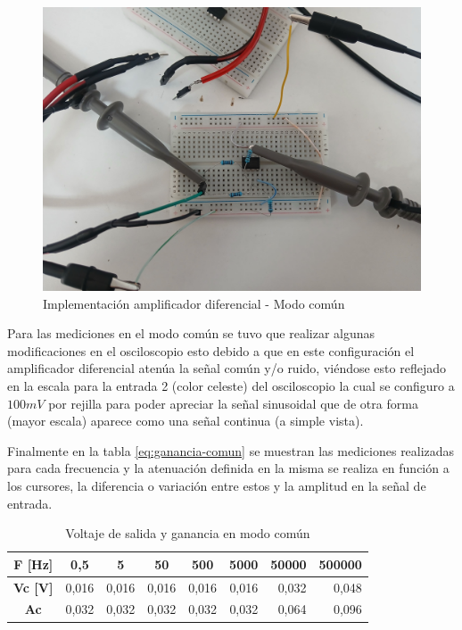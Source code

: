 \begin{figure}[h]
	\centering
	\includegraphics[width=0.5\linewidth]{media/imp-circuito-mod-comun}
	\caption{Implementación amplificador diferencial - Modo común}
	\label{fig:imp-circuito-mod-comun}
\end{figure}

Para las mediciones en el modo común se tuvo que realizar algunas modificaciones en el osciloscopio esto debido a que en este configuración el amplificador diferencial atenúa la señal común y/o ruido, viéndose esto reflejado en la escala para la entrada 2 (color celeste) del osciloscopio la cual se configuro a $100mV$ por rejilla para poder apreciar la señal sinusoidal que de otra forma (mayor escala) aparece como una señal continua (a simple vista).

Finalmente en la tabla \ref{eq:ganancia-comun} se muestran las mediciones realizadas para cada frecuencia y la atenuación definida en la misma se realiza en función a los cursores, la diferencia o variación entre estos y la amplitud en la señal de entrada.

\begin{table}[]
	\centering
	\begin{tabular}{|c|r|r|r|r|r|r|r|}
		\hline
		\textbf{F {[}Hz{]}} & \multicolumn{1}{c|}{\textbf{0,5}} & \multicolumn{1}{c|}{\textbf{5}} & \multicolumn{1}{c|}{\textbf{50}} & \multicolumn{1}{c|}{\textbf{500}} & \multicolumn{1}{c|}{\textbf{5000}} & \multicolumn{1}{c|}{\textbf{50000}} & \multicolumn{1}{c|}{\textbf{500000}} \\ \hline
		\textbf{Vc {[}V{]}} & 0,016                             & 0,016                           & 0,016                            & 0,016                             & 0,016                              & 0,032                               & 0,048                                \\ \hline
		\textbf{Ac}         & 0,032                             & 0,032                           & 0,032                            & 0,032                             & 0,032                              & 0,064                               & 0,096                                \\ \hline
	\end{tabular}
	\caption{Voltaje de salida y ganancia en modo común}
	\label{tab:ganancia-comun}
\end{table}

